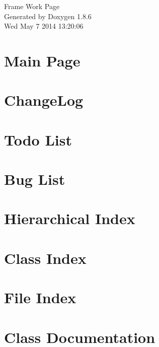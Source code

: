 \documentclass[twoside]{article}
\begin{document}
\hypersetup{pageanchor=false}
\begin{titlepage}
\vspace*{7cm}
\begin{center}%
{\Large Frame Work Page }\\
\vspace*{1cm}
{\large Generated by Doxygen 1.8.6}\\
\vspace*{0.5cm}
{\small Wed May 7 2014 13:20:06}\\
\end{center}
\end{titlepage}
\tableofcontents
{}
\hypersetup{pageanchor=true}

\section{Main Page}
\label{index}\hypertarget{index}{}
\section{Change\-Log}
\label{md_ChangeLog}
\hypertarget{md_ChangeLog}{}

\section{Todo List}
\label{todo}
\hypertarget{todo}{}

\section{Bug List}
\label{bug}
\hypertarget{bug}{}

\section{Hierarchical Index}

\section{Class Index}

\section{File Index}

\section{Class Documentation}
































\end{document}
